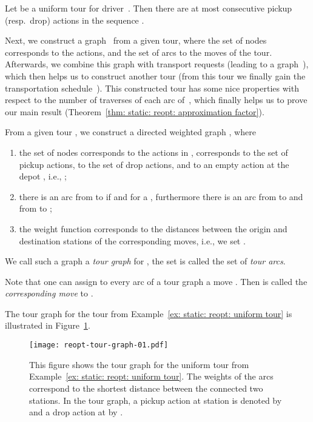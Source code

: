 \documentclass[english]{llncs}
\numberwithin{sublemma}{lemma}
\begin{document}
\begin{lemma}\label{lem: static: reopt: max consecutive actions}
  Let  be a uniform tour for driver~.
  Then there are at most  consecutive pickup (resp.~drop) actions in the sequence .
\end{lemma}





Next, we construct a graph~ from a given tour, where the set of nodes corresponds to the actions, and the set of arcs to the moves of the tour.
Afterwards, we combine this graph with transport requests (leading to a graph~), which then helps us to construct another tour (from this tour we finally gain the transportation schedule~).
This constructed tour has some nice properties with respect to the number of traverses of each arc of~, which finally helps us to prove our main result (Theorem~\ref{thm: static: reopt: approximation factor}).


From a given tour , we construct a directed weighted graph , where
\begin{enumerate}
 \item the set of nodes  corresponds to the actions in ,  corresponds to the set of pickup actions,  to the set of drop actions, and  to an empty action at the depot , i.e., ;
\item there is an arc from  to  if  and  for a , furthermore there is an arc from  to  and from  to ;
 \item the weight function  corresponds to the distances between the origin and destination stations of the corresponding moves, i.e., we set .
\end{enumerate}
We call such a graph a \emph{tour graph} for , the set  is called the set of \emph{tour arcs}.


Note that one can assign to every arc  of a tour graph a move .
Then  is called the \emph{corresponding move} to .


\begin{example}
The tour graph for the tour  from Example~\ref{ex: static: reopt: uniform tour} is illustrated in Figure~\ref{fig: static: reopt: tour 1 action}.
\begin{figure}[ht]
    \centering
    \texttt{[image: reopt-tour-graph-01.pdf]}
 \caption{
  This figure shows the tour graph for the uniform tour  from Example~\ref{ex: static: reopt: uniform tour}.
  The weights of the arcs correspond to the shortest distance between the connected two stations.
  In the tour graph, a pickup action at station  is denoted by  and a drop action at  by .
 }
 \label{fig: static: reopt: tour 1 action}
\end{figure}
\end{example}
\end{document}
